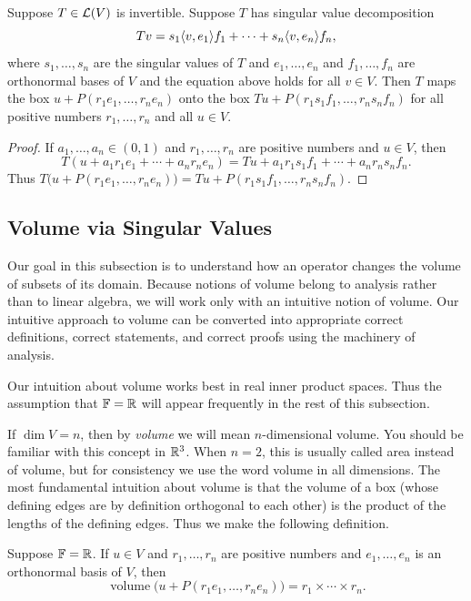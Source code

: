 \begin{result}\label{ax:7.107}
Suppose $T\in\mathcal{L}(V)$ is invertible. Suppose $T$ has singular value
decomposition
\[ Tv = s_1\langle v, e_1 \rangle f_1+\cdots+s_n\langle v, e_n \rangle f_n, \]
where $s_1,\dots,s_n$ are the singular values of $T$ and $e_1,\dots,e_n$ and
$f_1,\dots,f_n$ are orthonormal bases of $V$ and the equation above holds for
all $v\in V$. Then $T$ maps the box $u+P(r_1e_1,\dots,r_ne_n)$ onto the box
$Tu+P(r_1s_1f_1,\dots,r_ns_nf_n)$ for all positive numbers $r_1,\dots,r_n$ and
all $u\in V$.
\end{result}

\begin{proof}
If $a_1,\dots,a_n\in(0,1)$ and $r_1,\dots,r_n$ are positive numbers and
$u\in V$, then
\[ T(u+a_1r_1e_1+\cdots+a_nr_ne_n) = Tu+a_1r_1s_1f_1+\cdots+a_nr_ns_nf_n. \]
Thus $T\bigl(u+P(r_1e_1,\dots,r_ne_n)\bigr)=Tu+P(r_1s_1f_1,\dots,r_ns_nf_n)$.
\end{proof}

\subsection{Volume via Singular Values}

Our goal in this subsection is to understand how an operator changes the volume
of subsets of its domain. Because notions of volume belong to analysis rather
than to linear algebra, we will work only with an intuitive notion of volume.
Our intuitive approach to volume can be converted into appropriate correct
definitions, correct statements, and correct proofs using the machinery of
analysis.

Our intuition about volume works best in real inner product spaces. Thus the
assumption that $\mathbb{F}=\mathbb{R}$ will appear frequently in the rest of this subsection.

If $\dim V=n$, then by \emph{volume} we will mean $n$-dimensional volume. You
should be familiar with this concept in $\mathbb{R}^3$. When $n=2$, this is usually
called area instead of volume, but for consistency we use the word volume in
all dimensions. The most fundamental intuition about volume is that the volume
of a box (whose defining edges are by definition orthogonal to each other) is
the product of the lengths of the defining edges. Thus we make the following
definition.

\begin{definition}\label{ax:7.108}
Suppose $\mathbb{F}=\mathbb{R}$. If $u\in V$ and $r_1,\dots,r_n$ are positive numbers and
$e_1,\dots,e_n$ is an orthonormal basis of $V$, then
\[ \operatorname{volume}\bigl(u+P(r_1e_1,\dots,r_ne_n)\bigr)
   = r_1\times\cdots\times r_n. \]
\end{definition}

